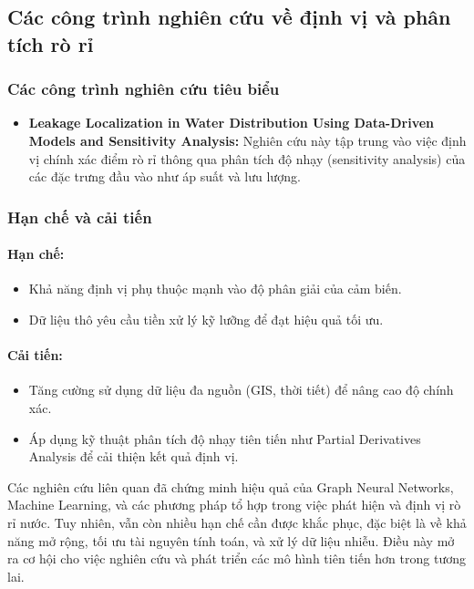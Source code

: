 \subsection{Các công trình nghiên cứu về định vị và phân tích rò rỉ}

\subsubsection*{Các công trình nghiên cứu tiêu biểu}
\begin{itemize}
    \item \textbf{Leakage Localization in Water Distribution Using Data-Driven Models and Sensitivity Analysis:} Nghiên cứu này\cite{Tom2018} tập trung vào việc định vị chính xác điểm rò rỉ thông qua phân tích độ nhạy (sensitivity analysis) của các đặc trưng đầu vào như áp suất và lưu lượng.
\end{itemize}

\subsubsection*{Hạn chế và cải tiến}

\paragraph{Hạn chế:}
\begin{itemize}
    \item Khả năng định vị phụ thuộc mạnh vào độ phân giải của cảm biến.
    \item Dữ liệu thô yêu cầu tiền xử lý kỹ lưỡng để đạt hiệu quả tối ưu.
\end{itemize}

\paragraph{Cải tiến:}
\begin{itemize}
    \item Tăng cường sử dụng dữ liệu đa nguồn (GIS, thời tiết) để nâng cao độ chính xác.
    \item Áp dụng kỹ thuật phân tích độ nhạy tiên tiến như Partial Derivatives Analysis để cải thiện kết quả định vị.
\end{itemize}

Các nghiên cứu liên quan đã chứng minh hiệu quả của Graph Neural Networks, Machine Learning, và các phương pháp tổ hợp trong việc phát hiện và định vị rò rỉ nước. Tuy nhiên, vẫn còn nhiều hạn chế cần được khắc phục, đặc biệt là về khả năng mở rộng, tối ưu tài nguyên tính toán, và xử lý dữ liệu nhiễu. Điều này mở ra cơ hội cho việc nghiên cứu và phát triển các mô hình tiên tiến hơn trong tương lai.

